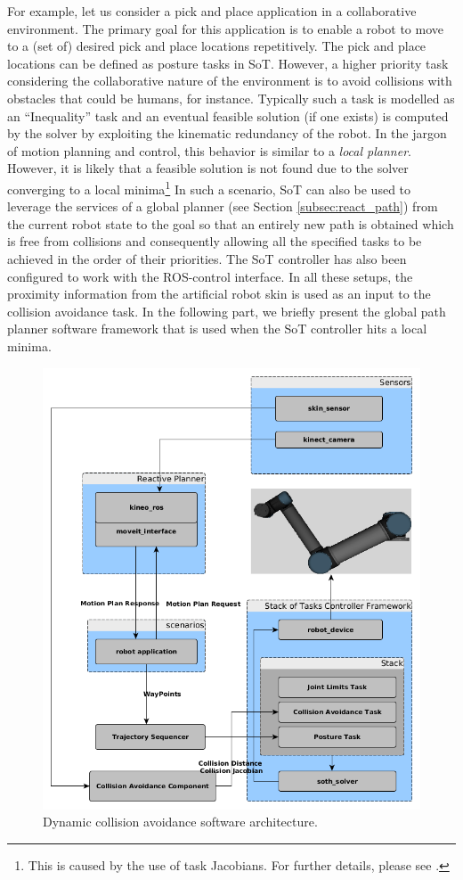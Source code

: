 For example, let us consider a pick and place application in a collaborative environment. The primary goal for this application is to enable a robot to move to a (set of) desired pick and place locations repetitively. The pick and place locations can be defined as posture tasks in SoT. However, a higher priority task considering the collaborative nature of the environment is to avoid
collisions with obstacles that could be humans, for instance. Typically such a task is modelled as an ``Inequality'' task and an eventual feasible solution (if one exists) is computed by the solver by exploiting the kinematic redundancy of the robot. In the jargon of motion planning and control, this behavior is similar to a \emph{local planner}. However, it is likely that a feasible solution is not found due to the solver converging to a local minima\footnote{This is caused by the use of task Jacobians. For further details, please see \cite{Mansard2009}.} In such a scenario, SoT can also be used to leverage the services of a global planner (see Section \ref{subsec:react_path}) from the current robot state to the goal so that an entirely new path is obtained which is free from collisions and consequently allowing all the specified tasks to be achieved in the order of their priorities. The SoT controller has also been configured to work with the ROS-control interface. In all these setups, the proximity information from the artificial robot skin is used as an input to the collision avoidance task. In the following part, we briefly present the global path planner software framework that is used when the SoT controller hits a local minima.
\begin{figure}[t]
\centering
\includegraphics[scale=0.47]{chapters/doa/images/arch_dca.png}
\caption[]{Dynamic collision avoidance software architecture.}
\label{fig:arch_dca}
\end{figure}
